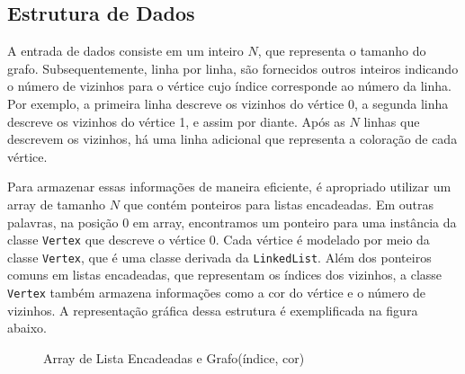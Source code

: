 \documentclass{article}
\begin{document}
\subsection{Estrutura de Dados}

A entrada de dados consiste em um inteiro $N$, que representa o tamanho do grafo. Subsequentemente, linha por linha, são fornecidos outros inteiros indicando o número de vizinhos para o vértice cujo índice corresponde ao número da linha. Por exemplo, a primeira linha descreve os vizinhos do vértice 0, a segunda linha descreve os vizinhos do vértice 1, e assim por diante. Após as $N$ linhas que descrevem os vizinhos, há uma linha adicional que representa a coloração de cada vértice.

Para armazenar essas informações de maneira eficiente, é apropriado utilizar um array de tamanho $N$ que contém ponteiros para listas encadeadas. Em outras palavras, na posição 0 em array, encontramos um ponteiro para uma instância da classe \texttt{Vertex} que descreve o vértice 0. Cada vértice é modelado por meio da classe \texttt{Vertex}, que é uma classe derivada da \texttt{LinkedList}. Além dos ponteiros comuns em listas encadeadas, que representam os índices dos vizinhos, a classe \texttt{Vertex} também armazena informações como a cor do vértice e o número de vizinhos. A representação gráfica dessa estrutura é exemplificada na figura abaixo.





\def\LinkedList#1{%
  \foreach \element in \list {
     \node[node of list, right = of aux, name=ele] {\element};
     \draw[link] (aux) -- (ele);
     \coordinate (aux) at (ele.east);
  } 
}

\begin{figure}
\begin{center}
\end{center}
\caption{Array de Lista Encadeadas e Grafo(índice, cor)}
\end{figure}
\end{document}
